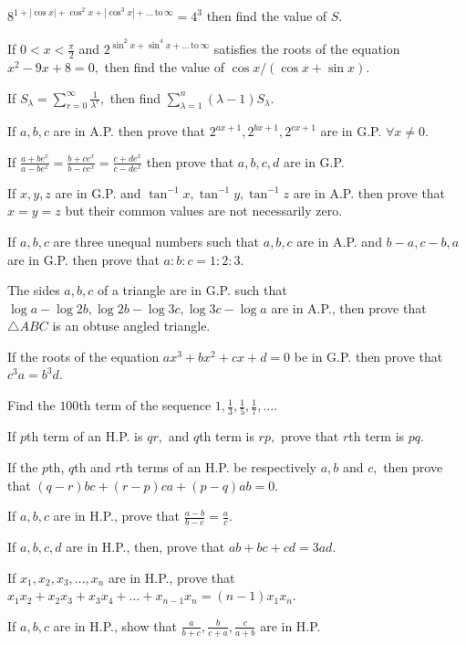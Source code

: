   $8^{1 + |\cos x| + \cos^2x + |\cos^3x| + \ldots\,\text{to}\,\infty} = 4^3$ then find the value of $S$.
\item If $0 < x <\frac{\pi}{2}$ and $2^{\sin^2x + \sin^4x + \ldots\,\text{to}\,\infty}$ satisfies the roots of the equation
  $x^2 - 9x + 8 = 0,$ then find the value of $\cos x/(\cos x + \sin x)$.
\item If $\displaystyle S_\lambda = \sum_{r=0}^\infty \frac{1}{\lambda^r},$ then find $\displaystyle\sum_{\lambda = 1}^n(\lambda - 1)S_\lambda$.
\item If $a, b, c$ are in A.P. then prove that $2^{ax + 1}, 2^{bx + 1}, 2^{cx + 1}$ are in G.P. $\forall x\neq 0$.
\item If $\frac{a + be^x}{a - be^x} = \frac{b + ce^x}{b - ce^x} = \frac{c + de^x}{c - de^x}$ then prove that $a, b, c, d$
  are in G.P.
\item If $x, y, z$ are in G.P. and $\tan^{-1}x, \tan^{-1}y, \tan^{-1}z$ are in A.P. then prove that $x = y = z$ but their
  common values are not necessarily zero.
\item If $a, b, c$ are three unequal numbers such that $a, b, c$ are in A.P. and $b - a, c - b, a$ are in G.P. then prove
  that $a:b:c = 1:2:3$.
\item The sides $a,b,c$ of a triangle are in G.P. such that $\log a - \log 2b, \log 2b - \log 3c, \log 3c - \log a$ are in
  A.P., then prove that $\triangle ABC$ is an obtuse angled triangle.
\item If the roots of the equation $ax^3 + bx^2 + cx + d = 0$ be in G.P. then prove that $c^3a = b^3d$.
\item Find the $100$th term of the sequence $1, \frac{1}{3}, \frac{1}{5}, \frac{1}{7}, \ldots$.
\item If $p$th term of an H.P. is $qr,$ and $q$th term is $rp,$ prove that $r$th term is $pq$.
\item If the $p$th, $q$th and $r$th terms of an H.P. be respectively $a, b$ and $c,$ then prove that $(q - r)bc + (r - p)ca + (p -
  q)ab = 0$.
\item If $a, b, c$ are in H.P., prove that $\frac{a - b}{b - c} = \frac{a}{c}$.
\item If $a, b, c, d$ are in H.P., then, prove that $ab + bc + cd = 3ad$.
\item If $x_1, x_2, x_3, \ldots, x_n$ are in H.P., prove that $x_1x_2 + x_2x_3 + x_3x_4 + \ldots + x_{n - 1}x_n = (n - 1)x_1x_n$.
\item If $a, b, c$ are in H.P., show that $\frac{a}{b + c}, \frac{b}{c + a}, \frac{c}{a + b}$ are in H.P.
